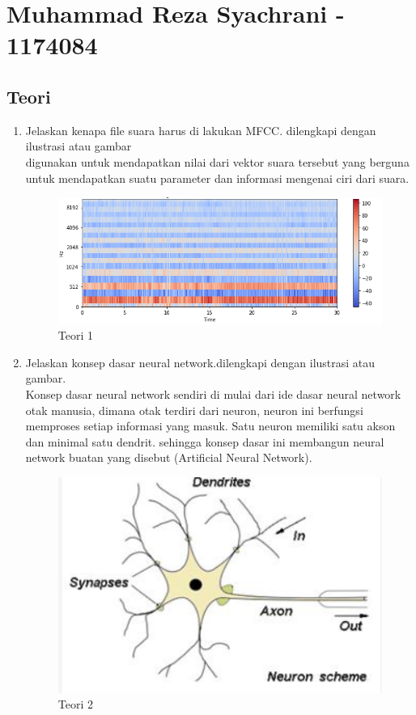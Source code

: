 \section{Muhammad Reza Syachrani - 1174084}
\subsection{Teori}
\begin{enumerate}

	\item Jelaskan kenapa ﬁle suara harus di lakukan MFCC. dilengkapi dengan ilustrasi atau gambar
	\hfill\\
digunakan untuk mendapatkan nilai dari vektor suara tersebut yang berguna untuk mendapatkan suatu parameter dan informasi mengenai ciri dari suara.
\begin{figure}[H]
    \includegraphics[width=12cm]{figures/1174084/6/teori1.png}
    \centering
    \caption{Teori 1}
\end{figure}

\item Jelaskan konsep dasar neural network.dilengkapi dengan ilustrasi atau gambar.
	\hfill\\
	Konsep dasar neural network sendiri di mulai dari ide dasar neural network otak manusia, dimana otak terdiri dari neuron, neuron ini berfungsi memproses setiap informasi yang masuk. Satu neuron memiliki satu akson dan minimal satu dendrit. sehingga konsep dasar ini membangun neural network buatan yang disebut (Artificial Neural Network).

\begin{figure}[H]
    \includegraphics[width=12cm]{figures/1174084/6/teori2.png}
    \centering
    \caption{Teori 2}
\end{figure}


\end{enumerate}
